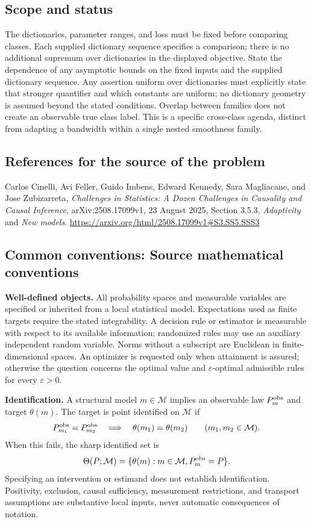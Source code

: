 \documentclass[11pt,a4paper]{article}
\begin{document}
\subsection*{Scope and status}
The dictionaries, parameter ranges, and loss must be fixed before comparing classes. Each supplied dictionary sequence specifies a comparison; there is no additional supremum over dictionaries in the displayed objective. State the dependence of any asymptotic bounds on the fixed inputs and the supplied dictionary sequence. Any assertion uniform over dictionaries must explicitly state that stronger quantifier and which constants are uniform; no dictionary geometry is assumed beyond the stated conditions. Overlap between families does not create an observable true class label. This is a specific cross-class agenda, distinct from adapting a bandwidth within a single nested smoothness family.
\subsection*{References for the source of the problem}
Carlos Cinelli, Avi Feller, Guido Imbens, Edward Kennedy, Sara Magliacane, and Jose Zubizarreta, \emph{Challenges in Statistics: A Dozen Challenges in Causality and Causal Inference}, arXiv:2508.17099v1, 23 August 2025, Section 3.5.3, \emph{Adaptivity} and \emph{New models}.
\url{https://arxiv.org/html/2508.17099v1#S3.SS5.SSS3}

\subsection*{Common conventions: Source mathematical conventions}

\textbf{Well-defined objects.}
All probability spaces and measurable variables are specified or inherited
from a local statistical model. Expectations used as finite targets require
the stated integrability. A decision rule or estimator is measurable with
respect to its available information; randomized rules may use an auxiliary
independent random variable. Norms without a subscript are Euclidean in
finite-dimensional spaces. An optimizer is requested only when attainment
is assured; otherwise the question concerns the optimal value and
$\varepsilon$-optimal admissible rules for every $\varepsilon>0$.

\textbf{Identification.}
A structural model $m\in\mathcal M$ implies an observable law
$P_m^{\rm obs}$ and target $\theta(m)$. The target is point identified on
$\mathcal M$ if
\[
 P_{m_1}^{\rm obs}=P_{m_2}^{\rm obs}
 \quad\Longrightarrow\quad\theta(m_1)=\theta(m_2)
 \qquad(m_1,m_2\in\mathcal M).
\]
When this fails, the sharp identified set is
\[
 \Theta(P;\mathcal M)=\{\theta(m):m\in\mathcal M,
                                  P_m^{\rm obs}=P\}.
\]
Specifying an intervention or estimand does not establish identification.
Positivity, exclusion, causal sufficiency, measurement restrictions, and
transport assumptions are substantive local inputs, never automatic
consequences of notation.
\end{document}
